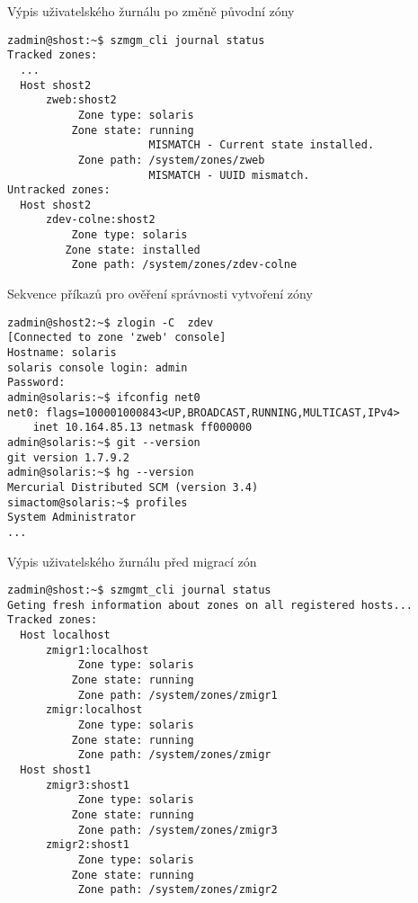 \begin{listing}[ht]
  \caption{Výpis uživatelského žurnálu po změně původní zóny}  
  \begin{verbatim}
zadmin@shost:~$ szmgm_cli journal status
Tracked zones:
  ...
  Host shost2
      zweb:shost2
           Zone type: solaris
          Zone state: running
                      MISMATCH - Current state installed.
           Zone path: /system/zones/zweb
                      MISMATCH - UUID mismatch.
Untracked zones:
  Host shost2
      zdev-colne:shost2
          Zone type: solaris
         Zone state: installed
          Zone path: /system/zones/zdev-colne
  \end{verbatim}
  \label{code:test:journal:change}
\end{listing}

\begin{listing}[ht]
  \caption{Sekvence příkazů pro ověření správnosti vytvoření zóny}  
  \begin{verbatim} 
zadmin@shost2:~$ zlogin -C  zdev
[Connected to zone 'zweb' console]
Hostname: solaris
solaris console login: admin
Password:
admin@solaris:~$ ifconfig net0
net0: flags=100001000843<UP,BROADCAST,RUNNING,MULTICAST,IPv4>
    inet 10.164.85.13 netmask ff000000
admin@solaris:~$ git --version
git version 1.7.9.2
admin@solaris:~$ hg --version
Mercurial Distributed SCM (version 3.4)
simactom@solaris:~$ profiles
System Administrator
...
  \end{verbatim}
  \label{code:test:deployment:result}
\end{listing}

\begin{listing}[ht]
  \caption{Výpis uživatelského žurnálu před migrací zón}  
  \begin{verbatim}
zadmin@shost:~$ szmgmt_cli journal status
Geting fresh information about zones on all registered hosts...
Tracked zones:
  Host localhost
      zmigr1:localhost
           Zone type: solaris
          Zone state: running
           Zone path: /system/zones/zmigr1
      zmigr:localhost
           Zone type: solaris
          Zone state: running
           Zone path: /system/zones/zmigr                 
  Host shost1
      zmigr3:shost1
           Zone type: solaris
          Zone state: running
           Zone path: /system/zones/zmigr3
      zmigr2:shost1
           Zone type: solaris
          Zone state: running
           Zone path: /system/zones/zmigr2      
  \end{verbatim}
  \label{code:test:migration:before}
\end{listing}


